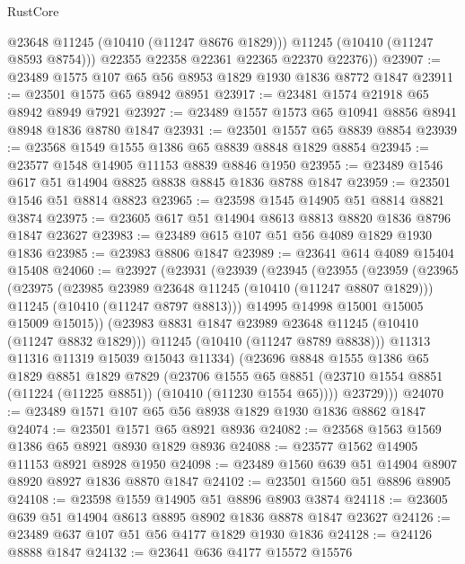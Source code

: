 \begin{lexlean}{RustCore}
\begin{coremodule}
            @23648
            @11245
            (@10410 (@11247 @8676 @1829)))
          @11245
          (@10410 (@11247 @8593 @8754)))
        @22355
        @22358
        @22361
        @22365
        @22370
        @22376))
@23907 := @23489 @1575 @107 @65 @56 @8953 @1829 @1930 @1836 @8772 @1847
@23911 := @23501 @1575 @65 @8942 @8951
@23917 := @23481 @1574 @21918 @65 @8942 @8949 @7921
@23927 := @23489 @1557 @1573 @65 @10941 @8856 @8941 @8948 @1836 @8780 @1847
@23931 := @23501 @1557 @65 @8839 @8854
@23939 := @23568 @1549 @1555 @1386 @65 @8839 @8848 @1829 @8854
@23945 := @23577 @1548 @14905 @11153 @8839 @8846 @1950
@23955 := @23489 @1546 @617 @51 @14904 @8825 @8838 @8845 @1836 @8788 @1847
@23959 := @23501 @1546 @51 @8814 @8823
@23965 := @23598 @1545 @14905 @51 @8814 @8821 @3874
@23975 := @23605 @617 @51 @14904 @8613 @8813 @8820 @1836 @8796 @1847 @23627
@23983 := @23489 @615 @107 @51 @56 @4089 @1829 @1930 @1836
@23985 := @23983 @8806 @1847
@23989 := @23641 @614 @4089 @15404 @15408
@24060 := @23927
    (@23931
      (@23939
        (@23945
          (@23955
            (@23959
              (@23965
                (@23975
                  (@23985 @23989 @23648 @11245 (@10410 (@11247 @8807 @1829)))
                  @11245
                  (@10410 (@11247 @8797 @8813)))
                @14995
                @14998
                @15001
                @15005
                @15009
                @15015))
            (@23983 @8831 @1847 @23989 @23648 @11245 (@10410 (@11247 @8832 @1829)))
            @11245
            (@10410 (@11247 @8789 @8838)))
          @11313
          @11316
          @11319
          @15039
          @15043
          @11334)
        (@23696
          @8848
          @1555
          @1386
          @65
          @1829
          @8851
          @1829
          @7829
          (@23706
            @1555
            @65
            @8851
            (@23710 @1554 @8851 (@11224 (@11225 @8851)) (@10410 (@11230 @1554 @65))))
          @23729)))
@24070 := @23489 @1571 @107 @65 @56 @8938 @1829 @1930 @1836 @8862 @1847
@24074 := @23501 @1571 @65 @8921 @8936
@24082 := @23568 @1563 @1569 @1386 @65 @8921 @8930 @1829 @8936
@24088 := @23577 @1562 @14905 @11153 @8921 @8928 @1950
@24098 := @23489 @1560 @639 @51 @14904 @8907 @8920 @8927 @1836 @8870 @1847
@24102 := @23501 @1560 @51 @8896 @8905
@24108 := @23598 @1559 @14905 @51 @8896 @8903 @3874
@24118 := @23605 @639 @51 @14904 @8613 @8895 @8902 @1836 @8878 @1847 @23627
@24126 := @23489 @637 @107 @51 @56 @4177 @1829 @1930 @1836
@24128 := @24126 @8888 @1847
@24132 := @23641 @636 @4177 @15572 @15576

\end{coremodule}
\end{lexlean}
